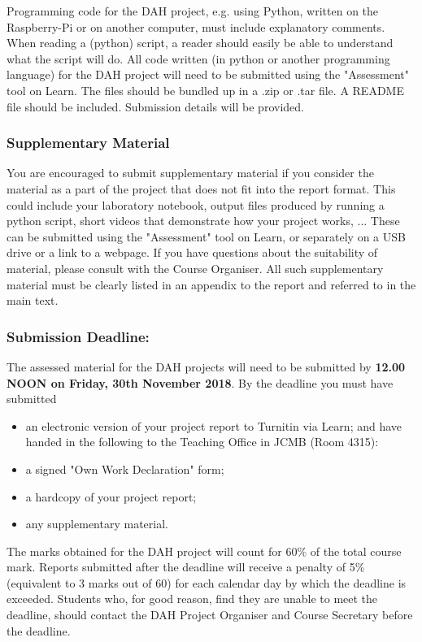 Programming code for the DAH project, e.g. using Python, written on the Raspberry-Pi or on another computer, must include explanatory comments. When reading a (python) script, a reader should easily be able to understand what the script will do. All code written (in python or another programming language)  for the DAH project will need to be submitted using the "Assessment" tool on Learn.  The files should be bundled up in a .zip or .tar file. A README file should be included. Submission details will be provided.

\subsubsection{Supplementary Material}

You are encouraged to submit supplementary material if you consider the material as a part of the project that does not fit into the report format. This could include your laboratory notebook, output files produced by running a python script, short videos that demonstrate how your project works, ... These can be submitted  using the "Assessment" tool on Learn, or separately on a USB drive or a link to a webpage. If you have questions about the suitability of material, please consult with the Course Organiser. All such supplementary material must be clearly listed in an appendix to the report and referred to in the main text. 

\subsubsection{Submission Deadline:}
The assessed material for the DAH projects will need to be submitted by {\bf 12.00 NOON on Friday, 30th November 2018}. By the deadline you must have submitted 
\begin{itemize}
\item an electronic version of your project report to Turnitin via Learn;
and have handed in the following to the Teaching Office in JCMB (Room 4315):
\item a signed "Own Work Declaration" form;
\item a hardcopy of your project report;
\item any supplementary material. 
\end{itemize}
The marks obtained for the DAH project will count for 60\% of the total course mark. 
Reports submitted after the deadline will receive a penalty of 5\% (equivalent to 3 marks out of 60) for each calendar day by which the deadline is exceeded. Students who, for good reason, find they are unable to meet the deadline, should contact the DAH Project Organiser and Course Secretary before
the deadline.

